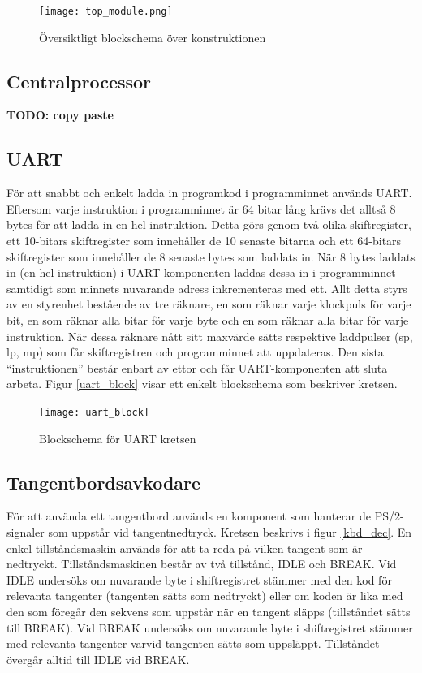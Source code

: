 \documentclass[a4paper]{article}
\begin{document}
    \begin{figure}[H]
        \centering
        \texttt{[image: top\_module.png]}
        \caption{Översiktligt blockschema över  konstruktionen}
        \label{fig:top_module}
    \end{figure}
    
    \subsection{Centralprocessor}
    \textbf{TODO: copy paste}




    \subsection{UART}
    För att snabbt och enkelt ladda in programkod i programminnet används UART.
    Eftersom varje instruktion i programminnet är 64 bitar lång krävs det alltså 8
    bytes för att ladda in en hel instruktion. Detta görs genom två olika
    skiftregister, ett 10-bitars skiftregister som innehåller de 10 senaste bitarna
    och ett 64-bitars skiftregister som innehåller de 8 senaste bytes som laddats
    in. När 8 bytes laddats in (en hel instruktion) i UART-komponenten laddas dessa
    in i programminnet samtidigt som minnets nuvarande adress inkrementeras med ett.
    Allt detta styrs av en styrenhet bestående av tre räknare, en som räknar varje
    klockpuls för varje bit, en som räknar alla bitar för varje byte och en som
    räknar alla bitar för varje instruktion. När dessa räknare nått sitt maxvärde
    sätts respektive laddpulser (sp, lp, mp) som får skiftregistren och
    programminnet att uppdateras. Den sista “instruktionen” består enbart av ettor
    och får UART-komponenten att sluta arbeta. Figur \ref{uart_block} visar ett enkelt blockschema
    som beskriver kretsen. 

    \begin{figure}[H]
        \centering
        \texttt{[image: uart\_block]}
        \caption{Blockschema för UART kretsen}
        \label{fig:uart_block}
    \end{figure}



    \subsection{Tangentbordsavkodare}

    För att använda ett tangentbord används en komponent som hanterar de
    PS/2-signaler som uppstår vid tangentnedtryck. Kretsen beskrivs i figur
    \ref{kbd_dec}. En
    enkel tillståndsmaskin används för att ta reda på vilken tangent som är
    nedtryckt. Tillståndsmaskinen består av två tillstånd, IDLE och BREAK. Vid IDLE
    undersöks om nuvarande byte i shiftregistret stämmer med den kod för relevanta
    tangenter (tangenten sätts som nedtryckt) eller om koden är lika med den som
    föregår den sekvens som uppstår när en tangent släpps (tillståndet sätts till
    BREAK). Vid BREAK undersöks om nuvarande byte i shiftregistret stämmer med
    relevanta tangenter varvid tangenten sätts som uppsläppt. Tillståndet övergår
    alltid till IDLE vid BREAK.  
\end{document}
